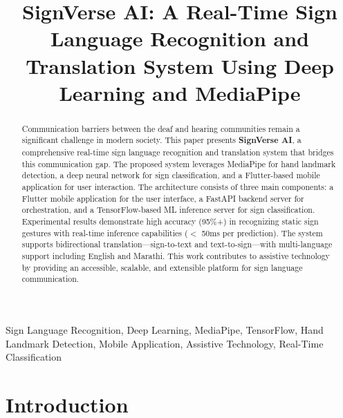\documentclass[conference]{IEEEtran}
\begin{document}
\title{SignVerse AI: A Real-Time Sign Language Recognition and Translation System Using Deep Learning and MediaPipe}

\author{
}

\maketitle

\begin{abstract}
Communication barriers between the deaf and hearing communities remain a significant challenge in modern society. This paper presents \textbf{SignVerse AI}, a comprehensive real-time sign language recognition and translation system that bridges this communication gap. The proposed system leverages MediaPipe for hand landmark detection, a deep neural network for sign classification, and a Flutter-based mobile application for user interaction. The architecture consists of three main components: a Flutter mobile application for the user interface, a FastAPI backend server for orchestration, and a TensorFlow-based ML inference server for sign classification. Experimental results demonstrate high accuracy (95\%+) in recognizing static sign gestures with real-time inference capabilities ($<$ 50ms per prediction). The system supports bidirectional translation—sign-to-text and text-to-sign—with multi-language support including English and Marathi. This work contributes to assistive technology by providing an accessible, scalable, and extensible platform for sign language communication.
\end{abstract}

\begin{IEEEkeywords}
Sign Language Recognition, Deep Learning, MediaPipe, TensorFlow, Hand Landmark Detection, Mobile Application, Assistive Technology, Real-Time Classification
\end{IEEEkeywords}

\section{Introduction}
\end{document}

